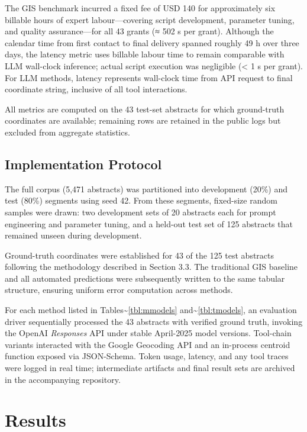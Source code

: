 The GIS benchmark incurred a fixed fee of USD 140 for approximately six
billable hours of expert labour---covering script development, parameter
tuning, and quality assurance---for all 43 grants (≈ 502 s per grant).
Although the calendar time from first contact to final delivery spanned
roughly 49 h over three days, the latency metric uses billable labour
time to remain comparable with LLM wall-clock inference; actual script
execution was negligible (\textless{} 1 s per grant). For LLM methods,
latency represents wall-clock time from API request to final coordinate
string, inclusive of all tool interactions.

All metrics are computed on the 43 test-set abstracts for which
ground-truth coordinates are available; remaining rows are retained in
the public logs but excluded from aggregate statistics.

\subsection{Implementation Protocol}\label{implementation-protocol}

The full corpus (5,471 abstracts) was partitioned into development
(20\%) and test (80\%) segments using seed 42. From these segments,
fixed-size random samples were drawn: two development sets of 20
abstracts each for prompt engineering and parameter tuning, and a
held-out test set of 125 abstracts that remained unseen during
development.

Ground-truth coordinates were established for 43 of the 125 test
abstracts following the methodology described in Section 3.3. The
traditional GIS baseline and all automated predictions were subsequently
written to the same tabular structure, ensuring uniform error
computation across methods.

For each method listed in Tables\textasciitilde{}\ref{tbl:mmodels}
and\textasciitilde{}\ref{tbl:tmodels}, an evaluation driver sequentially
processed the 43 abstracts with verified ground truth, invoking the
OpenAI \emph{Responses} API under stable April-2025 model versions.
Tool-chain variants interacted with the Google Geocoding API and an
in-process centroid function exposed via JSON-Schema. Token usage,
latency, and any tool traces were logged in real time; intermediate
artifacts and final result sets are archived in the accompanying
repository.

\section{Results}\label{results}

